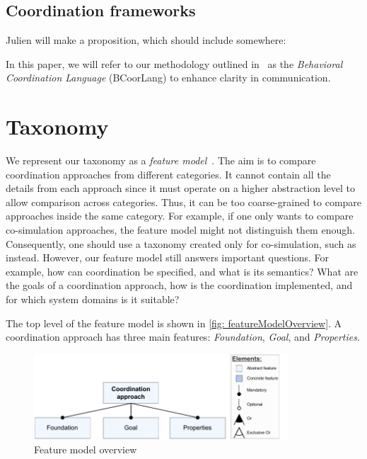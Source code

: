 \documentclass[runningheads]{llncs}
\begin{document}
\subsection{Coordination frameworks} \label{subsec: frameworks}

Julien will make a proposition, which should include somewhere:

In this paper, we will refer to our methodology outlined in~\cite{krauterBehavioralConsistencyMultimodeling2023} as the \textit{Behavioral Coordination Language} (BCoorLang) to enhance clarity in communication.

\section{Taxonomy} \label{sec: taxonomy}
We represent our taxonomy as a \textit{feature model}~\cite{kangFeatureOrientedDomainAnalysis1990}.
The aim is to compare coordination approaches from different categories.
It cannot contain all the details from each approach since it must operate on a higher abstraction level to allow comparison across categories.
Thus, it can be too coarse-grained to compare approaches inside the same category.
For example, if one only wants to compare co-simulation approaches, the feature model might not distinguish them enough.
Consequently, one should use a taxonomy created only for co-simulation, such as~\cite{gomesCoSimulationSurvey2019} instead.
However, our feature model still answers important questions.
For example, how can coordination be specified, and what is its semantics?
What are the goals of a coordination approach, how is the coordination implemented, and for which system domains is it suitable?

The top level of the feature model is shown in \autoref{fig: featureModelOverview}.
A coordination approach has three main features: \textit{Foundation}, \textit{Goal}, and \textit{Properties}.

\begin{figure}[ht]
	\centering
	\includegraphics[width=0.85\textwidth]{images/root}
	\caption{Feature model overview}
	\label{fig: featureModelOverview}
\end{figure}
\end{document}
